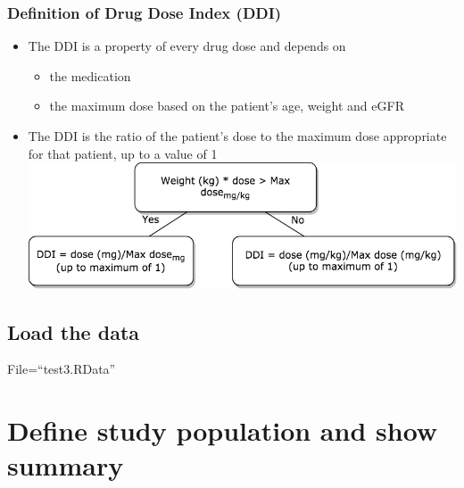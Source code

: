 \documentclass[]{article}
\providecommand{\tightlist}{%
  \setlength{\itemsep}{0pt}\setlength{\parskip}{0pt}}
\begin{document}
\hypertarget{definition-of-drug-dose-index-ddi}{%
\subsubsection{Definition of Drug Dose Index
(DDI)}\label{definition-of-drug-dose-index-ddi}}

\begin{itemize}
\tightlist
\item
  The DDI is a property of every drug dose and depends on

  \begin{itemize}
  \tightlist
  \item
    the medication
  \item
    the maximum dose based on the patient's age, weight and eGFR
  \end{itemize}
\item
  The DDI is the ratio of the patient's dose to the maximum dose
  appropriate for that patient, up to a value of 1
  \includegraphics{results/DDI_algorithm.png}
\end{itemize}

\hypertarget{load-the-data}{%
\subsection{Load the data}\label{load-the-data}}

File=``test3.RData''

\hypertarget{define-study-population-and-show-summary}{%
\section{Define study population and show
summary}\label{define-study-population-and-show-summary}}
\end{document}
